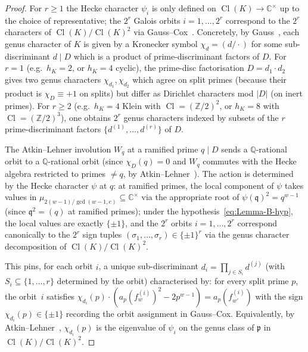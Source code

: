 \documentclass[11pt,a4paper]{amsart}
\theoremstyle{plain}
\theoremstyle{definition}
\DeclareMathOperator{\Cl}{Cl}
\newcommand{\Q}{\mathbb{Q}}
\newcommand{\Z}{\mathbb{Z}}
\newcommand{\C}{\mathbb{C}}
\newcommand{\absD}{\lvert D\rvert}
\newcommand{\fl}[2]{f_{#1}^{(#2)}}
\begin{document}
\begin{proof}
For $r \ge 1$ the Hecke character $\psi_i$ is only defined on
$\Cl(K) \to \C^\times$ up to the choice of representative; the $2^r$
Galois orbits $i = 1, \ldots, 2^r$ correspond to the $2^r$ characters
of $\Cl(K) / \Cl(K)^2$ via Gauss--Cox~\cite[Thm.~6.1]{Cox1989}.
Concretely, by Gauss~\cite[\S 232--235]{Gauss1801}, each genus character
of $K$ is given by a Kronecker symbol $\chi_d = (d/\cdot)$ for some
sub-discriminant $d \mid D$ which is a product of prime-discriminant
factors of $D$.  For $r = 1$ (e.g.~$h_K = 2$, or
$h_K = 4$ cyclic), the prime-disc factorisation $D = d_1 \cdot d_2$
gives two genus characters $\chi_{d_1}, \chi_{d_2}$ which agree on split
primes (because their product is $\chi_D \equiv +1$ on splits) but
differ as Dirichlet characters mod $\absD$ (on inert primes).
For $r \ge 2$ (e.g.~$h_K = 4$ Klein with $\Cl = (\Z/2)^2$, or
$h_K = 8$ with $\Cl = (\Z/2)^3$), one obtains $2^r$ genus characters
indexed by subsets of the $r$ prime-discriminant factors
$\{d^{(1)}, \ldots, d^{(r)}\}$ of $D$.

The Atkin--Lehner involution $W_q$ at a ramified prime $q \mid D$
sends a $\Q$-rational orbit to a $\Q$-rational orbit (since
$\chi_D(q) = 0$ and $W_q$ commutes with the Hecke algebra
restricted to primes $\ne q$, by Atkin--Lehner~\cite{AtkinLehner1970}).
The action is determined by the Hecke character $\psi$ at $q$: at
ramified primes, the local component of $\psi$ takes values in
$\mu_{2(w-1)/\gcd(w-1, e)} \subseteq \C^\times$ via the appropriate root
of $\psi(\mathfrak{q})^{2} = q^{w-1}$
(since $\mathfrak{q}^2 = (q)$ at ramified primes); under the
hypothesis~\eqref{eq:Lemma-B-hyp}, the local values are exactly
$\{\pm 1\}$, and the $2^r$ orbits $i = 1, \ldots, 2^r$ correspond
canonically to the $2^r$ sign tuples
$(\sigma_1, \ldots, \sigma_r) \in \{\pm 1\}^r$ via the genus
character decomposition of $\Cl(K)/\Cl(K)^2$.

This pins, for each orbit $i$, a unique sub-discriminant
$d_i = \prod_{j \in S_i} d^{(j)}$ (with $S_i \subseteq \{1, \ldots, r\}$
determined by the orbit) characterised by: for every split prime $p$,
the orbit~$i$ satisfies
$\chi_{d_i}(p) \cdot (a_p(\fl{w}{i})^2 - 2p^{w-1}) = a_p(\fl{w'}{i})$
with the sign $\chi_{d_i}(p) \in \{\pm 1\}$ recording the orbit
assignment in Gauss--Cox.  Equivalently, by
Atkin--Lehner~\cite[\S 5]{AtkinLehner1970}, $\chi_{d_i}(p)$ is the
eigenvalue of $\psi_i$ on the genus class of $\mathfrak{p}$ in
$\Cl(K)/\Cl(K)^2$.


\end{proof}
\end{document}
